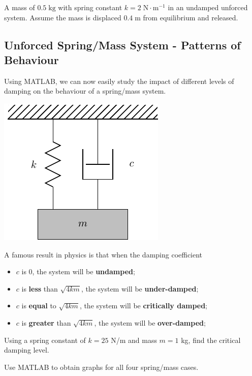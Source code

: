 A mass of $0.5 \; \text{kg}$ with spring constant
$k = 2 \; \text{N} \cdot \text{m}^{-1}$ in an undamped unforced
system.  Assume the mass is displaced $0.4 \; \text{m}$ from
equilibrium and released.


\newpage
{}
\subsection*{Unforced Spring/Mass System - Patterns of Behaviour}

Using MATLAB, we can now easily study the impact of different levels
of damping on the behaviour of a spring/mass system.

\includegraphics[width=0.2\linewidth]{graphics/notes_08_hanging_mass}

A famous result in physics is that when the damping coefficient
\begin{itemize}
\item $c$ is 0, the system will be {\bf undamped};
\item $c$ is {\bf less} than $\sqrt{4km}$, the system will be {\bf under-damped};
\item $c$ is {\bf equal} to $\sqrt{4km}$, the system will be {\bf
    critically damped};
\item $c$ is {\bf greater} than $\sqrt{4km}$, the system will be {\bf
    over-damped};
\end{itemize}

\problem Using a spring constant of $k = 25$ N/m and mass $m = 1$ kg,
find the critical damping level.

\newpage
\problem Use MATLAB to obtain graphs for all four spring/mass cases.

